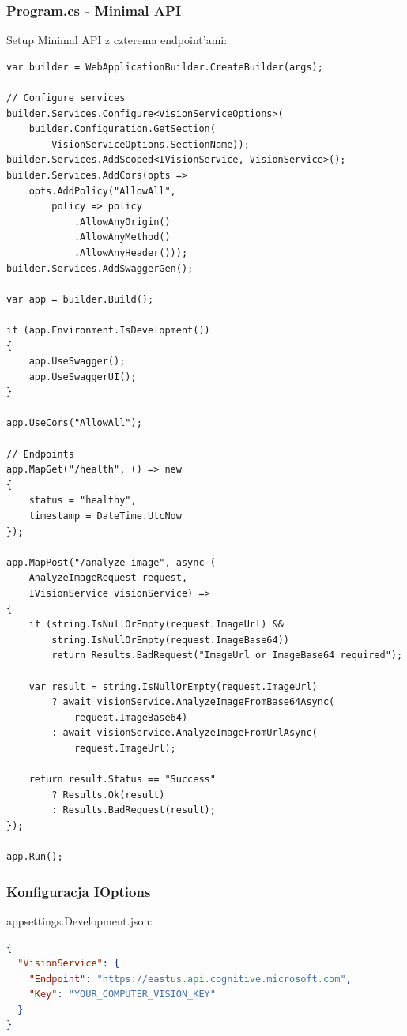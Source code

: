 \documentclass[twoside]{article}
\begin{document}
\subsubsection{Program.cs - Minimal API}

Setup Minimal API z czterema endpoint'ami:

\begin{lstlisting}
var builder = WebApplicationBuilder.CreateBuilder(args);

// Configure services
builder.Services.Configure<VisionServiceOptions>(
    builder.Configuration.GetSection(
        VisionServiceOptions.SectionName));
builder.Services.AddScoped<IVisionService, VisionService>();
builder.Services.AddCors(opts => 
    opts.AddPolicy("AllowAll",
        policy => policy
            .AllowAnyOrigin()
            .AllowAnyMethod()
            .AllowAnyHeader()));
builder.Services.AddSwaggerGen();

var app = builder.Build();

if (app.Environment.IsDevelopment())
{
    app.UseSwagger();
    app.UseSwaggerUI();
}

app.UseCors("AllowAll");

// Endpoints
app.MapGet("/health", () => new
{
    status = "healthy",
    timestamp = DateTime.UtcNow
});

app.MapPost("/analyze-image", async (
    AnalyzeImageRequest request,
    IVisionService visionService) =>
{
    if (string.IsNullOrEmpty(request.ImageUrl) && 
        string.IsNullOrEmpty(request.ImageBase64))
        return Results.BadRequest("ImageUrl or ImageBase64 required");

    var result = string.IsNullOrEmpty(request.ImageUrl)
        ? await visionService.AnalyzeImageFromBase64Async(
            request.ImageBase64)
        : await visionService.AnalyzeImageFromUrlAsync(
            request.ImageUrl);

    return result.Status == "Success" 
        ? Results.Ok(result) 
        : Results.BadRequest(result);
});

app.Run();
\end{lstlisting}

\subsubsection{Konfiguracja IOptions}

appsettings.Development.json:

\begin{lstlisting}[language=json]
{
  "VisionService": {
    "Endpoint": "https://eastus.api.cognitive.microsoft.com",
    "Key": "YOUR_COMPUTER_VISION_KEY"
  }
}
\end{lstlisting}
\end{document}
